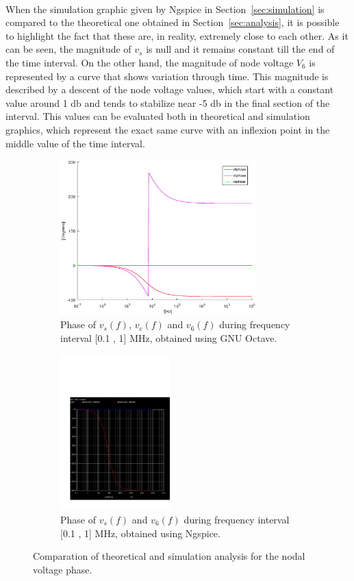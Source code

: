 \paragraph{}
When the simulation graphic given by Ngspice in Section~\ref{sec:simulation} is compared to the theoretical one obtained in Section~\ref{sec:analysis}, it is possible to highlight the fact that these are, in reality, extremely close to each other. As it can be seen, the magnitude of $v_s$ is null and it remains constant till the end of the time interval. On the other hand, the magnitude of node voltage $V_6$ is represented by a curve that shows variation through time. This magnitude is described by a descent of the node voltage values, which start with a constant value around 1 db and tends to stabilize near -5 db in the final section of the interval. This values can be evaluated both in theoretical and simulation graphics, which represent the exact same curve with an inflexion point in the middle value of the time interval.


\begin{figure}[H]

\begin{subfigure}{0.5\textwidth}
\includegraphics[width=0.9\linewidth, height=6cm]{phase.eps} 
\caption{Phase of $v_s(f)$,  $v_c(f)$  and $v_6(f)$ during frequency interval [0.1 , 1] MHz, obtained using GNU Octave.}
\label{fig:theo_third}
\end{subfigure}
\begin{subfigure}{0.5\textwidth}
\includegraphics[width=0.9\linewidth, height=6cm]{acp.pdf}
\caption{Phase of $v_s(f)$ and $v_6(f)$ during frequency interval [0.1 , 1] MHz, obtained using Ngspice.}
\label{fig:total}
\end{subfigure}

\caption{Comparation of theoretical and simulation analysis for the nodal voltage phase.}
\label{fig:compar_4}
\end{figure}

